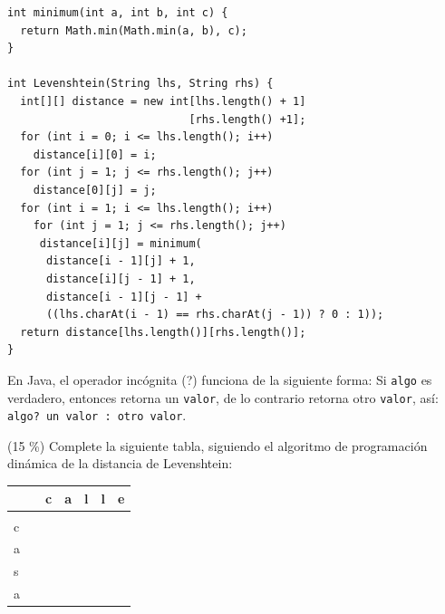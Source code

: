\documentclass[twocolumn]{article}
\begin{document}
{\small
\begin{verbatim}
int minimum(int a, int b, int c) {                            
  return Math.min(Math.min(a, b), c);                                      
}                                                                            
                                                                                
int Levenshtein(String lhs, String rhs) {      
  int[][] distance = new int[lhs.length() + 1]
                            [rhs.length() +1];                                   
  for (int i = 0; i <= lhs.length(); i++)                                 
    distance[i][0] = i;                                                  
  for (int j = 1; j <= rhs.length(); j++)                                 
    distance[0][j] = j;                                                                     
  for (int i = 1; i <= lhs.length(); i++)                                 
    for (int j = 1; j <= rhs.length(); j++)                             
     distance[i][j] = minimum(                                        
      distance[i - 1][j] + 1,                                  
      distance[i][j - 1] + 1,                                  
      distance[i - 1][j - 1] + 
      ((lhs.charAt(i - 1) == rhs.charAt(j - 1)) ? 0 : 1));                                                           
  return distance[lhs.length()][rhs.length()];                          
}                                                                            
\end{verbatim}
}


En Java, el operador incógnita (?) funciona de la siguiente forma: Si \texttt{algo} es verdadero, entonces retorna un \texttt{valor},
de lo contrario retorna otro \texttt{valor}, así:
\texttt{algo? un valor : otro valor}.


(15 \%) Complete la siguiente tabla, siguiendo el algoritmo de programación dinámica de la distancia de Levenshtein:\\

\begin{tabular}{| l  | l  | l  | l  | l  | l  | l |}
\hline
  & & c & a & l & l & e \\
 \hline
  & &  &  &  &  &  \\
  \hline
c & &  &  &  &  &  \\
\hline
a & &  &  &  &  &  \\
\hline
s & &  &  &  &  &  \\
\hline
a & &  &  &  &  &  \\
\hline
\end{tabular}
\end{document}
